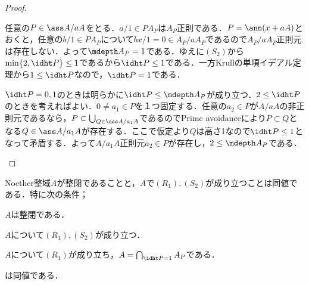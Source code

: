 \begin{proof}
	\begin{eqv}
		\item 任意の$P\in\ass A/aA$をとる．$a/1\in PA_P$は$A_P$正則である．$P=\ann (x+aA)$とおくと，任意の$b/1\in PA_P$について$bx/1=0\in A_P/aA_P$であるので$A_P/aA_P$正則元は存在しない．よって$\mdepth A_P=1$である．ゆえに$(S_2)$から$\min\{2,\idht P\}\leq1$であるから$\idht P\leq1$である．一方Krullの単項イデアル定理から$1\leq\idht P$なので，$\idht P=1$である．
		\item $\idht P=0,1$のときは明らかに$\idht P\leq\mdepth A_P$が成り立つ．$2\leq\idht P$のときを考えればよい．$0\neq a_1\in P$を１つ固定する．任意の$a_2\in P$が$A/aA$の非正則元であるなら，$P\subset\bigcup_{Q\in\ass A/a_1A}$であるのでPrime avoidanceにより$P\subset Q$となる$Q\in\ass A/a_1A$が存在する．ここで仮定より$Q$は高さ1なので$\idht P\leq1$となって矛盾する．よって$A/a_1A$正則元$a_2\in P$が存在し，$2\leq\mdepth A_P$である．
	\end{eqv}
\end{proof}

\begin{thm}
	Noether整域$A$が整閉であることと，$A$で$(R_1),(S_2)$が成り立つことは同値である．特に次の条件；
	\begin{sakura}
		\item $A$は整閉である．
		\item $A$について$(R_1),(S_2)$が成り立つ．
		\item $A$について$(R_1)$が成り立ち，$A=\bigcap_{\idht P=1}A_P$である．
	\end{sakura}
	は同値である．
\end{thm}

